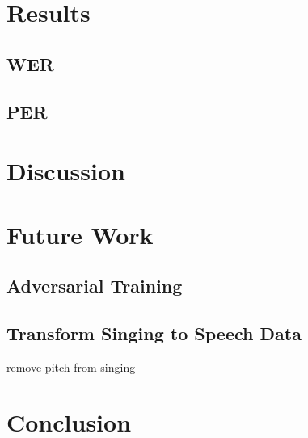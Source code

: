 \documentclass[letterpaper, 12pt]{article}
\begin{document}
\begin{multicols*}{2}
\section{Results}

\subsection{WER}

\subsection{PER}

\section{Discussion}

\section{Future Work}
\subsection{Adversarial Training}
\subsection{Transform Singing to Speech Data}
remove pitch from singing


\section{Conclusion}

\printbibliography

\end{multicols*}
\end{document}
